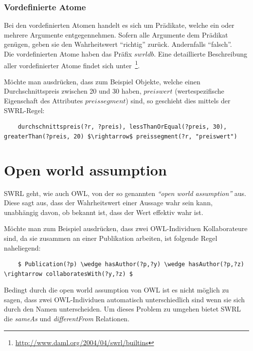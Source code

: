 \subsubsection{Vordefinierte Atome}
\label{ssubsec:swrl_aufbau_atomaretypen_vordefinierteatome}
Bei den vordefinierten Atomen handelt es sich um Prädikate, welche ein oder mehrere Argumente entgegennehmen. Sofern alle Argumente dem Prädikat genügen, geben sie den Wahrheitswert ``richtig'' zurück. Andernfalls ``falsch''.\\
Die vordefinierten Atome haben das Präfix $swrldb$. Eine detaillierte Beschreibung aller vordefinierter Atome findet sich unter~\footnote{\url{http://www.daml.org/2004/04/swrl/builtins}}.

Möchte man ausdrücken, dass zum Beispiel Objekte, welche einen Durchschnittspreis zwischen 20 und 30 haben, $preiswert$ (wertespezifische Eigenschaft des Attributes $preissegment$) sind, so geschieht dies mittels der SWRL-Regel:
\lstset{language=XML}
\begin{lstlisting}
    durchschnittspreis(?r, ?preis), lessThanOrEqual(?preis, 30), greaterThan(?preis, 20) $\rightarrow$ preissegment(?r, "preiswert")
\end{lstlisting}

\newpage

\section{Open world assumption}
\label{sec:swrl_openworldassumption}
SWRL geht, wie auch OWL, von der so genannten \textit{``open world assumption''} aus. Diese sagt aus, dass der Wahrheitswert einer Aussage wahr sein kann, unabhängig davon, ob bekannt ist, dass der Wert effektiv wahr ist.

Möchte man zum Beispiel ausdrücken, dass zwei OWL-Individuen Kollaborateure sind, da sie zusammen an einer Publikation arbeiten, ist folgende Regel naheliegend:

\lstset{language=XML}
\begin{lstlisting}
    $ Publication(?p) \wedge hasAuthor(?p,?y) \wedge hasAuthor(?p,?z) \rightarrow collaboratesWith(?y,?z) $
\end{lstlisting}

Bedingt durch die open world assumption von OWL ist es nicht möglich zu sagen, dass zwei OWL-Individuen automatisch unterschiedlich sind wenn sie sich durch den Namen unterscheiden. Um dieses Problem zu umgehen bietet SWRL die \textit{sameAs} und \textit{differentFrom} Relationen.

